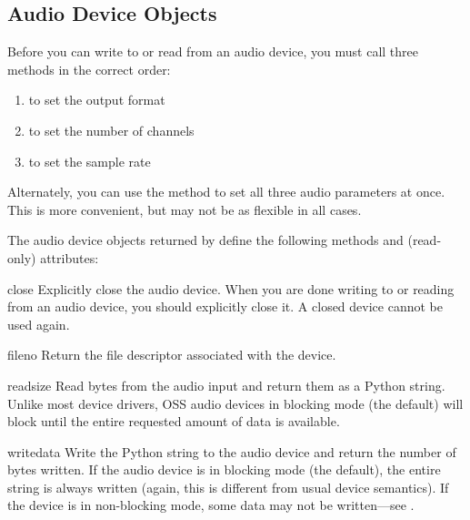\subsection{Audio Device Objects \label{ossaudio-device-objects}}

Before you can write to or read from an audio device, you must call
three methods in the correct order:
\begin{enumerate}
\item {} to set the output format
\item {} to set the number of channels
\item {} to set the sample rate
\end{enumerate}
Alternately, you can use the  method to set all
three audio parameters at once.  This is more convenient, but may not be
as flexible in all cases.

The audio device objects returned by  define the
following methods and (read-only) attributes:

\begin{methoddesc}{close}{}
Explicitly close the audio device.  When you are done writing to or
reading from an audio device, you should explicitly close it.  A closed
device cannot be used again.
\end{methoddesc}

\begin{methoddesc}{fileno}{}
Return the file descriptor associated with the device.
\end{methoddesc}

\begin{methoddesc}{read}{size}
Read  bytes from the audio input and return them as a Python
string.  Unlike most \UNIX{} device drivers, OSS audio devices in
blocking mode (the default) will block  until the
entire requested amount of data is available.
\end{methoddesc}

\begin{methoddesc}{write}{data}
Write the Python string  to the audio device and return the
number of bytes written.  If the audio device is in blocking mode (the
default), the entire string is always written (again, this is different
from usual \UNIX{} device semantics).  If the device is in non-blocking
mode, some data may not be written---see .
\end{methoddesc}

